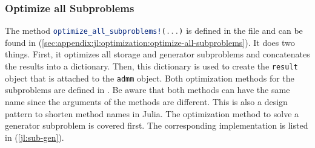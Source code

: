 \subsubsection*{Optimize all Subproblems}

The method \lstinline[language=julia]{optimize_all_subproblems!(...)} is defined in the file  and can be found in (\ref{sec:appendix:jl:optimization:optimize-all-subproblems}). It does two things. First, it optimizes all storage and generator subproblems and concatenates the results into a dictionary. Then, this dictionary is used to create the \lstinline[language=julia]{result} object that is attached to the \lstinline[language=julia]{admm} object. Both optimization methods for the subproblems are defined in . Be aware that both methods can have the same name since the arguments of the methods are different. This is also a design pattern to shorten method names in Julia. The optimization method to solve a generator subproblem is covered first. The corresponding implementation is listed in (\ref{jl:sub-gen}).



